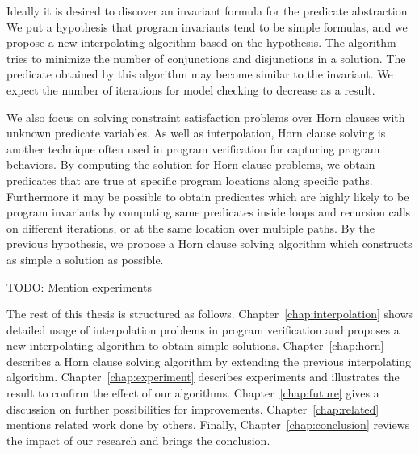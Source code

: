 Ideally it is desired to discover an invariant formula for the
predicate abstraction.  We put a hypothesis that program invariants
tend to be simple formulas, and we propose a new interpolating
algorithm based on the hypothesis.  The algorithm tries to minimize
the number of conjunctions and disjunctions in a solution.  The
predicate obtained by this algorithm may become similar to the
invariant. We expect the number of iterations for model checking to
decrease as a result.

We also focus on solving constraint satisfaction problems over Horn
clauses with unknown predicate variables.  As well as interpolation,
Horn clause solving is another technique often used in program
verification for capturing program behaviors.  By computing the
solution for Horn clause problems, we obtain predicates that are true
at specific program locations along specific paths.  Furthermore it
may be possible to obtain predicates which are highly likely to be
program invariants by computing same predicates inside loops and
recursion calls on different iterations, or at the same location over
multiple paths.  By the previous hypothesis, we propose a Horn clause
solving algorithm which constructs as simple a solution as possible.

TODO: Mention experiments

The rest of this thesis is structured as follows.
Chapter~\ref{chap:interpolation} shows detailed usage of interpolation
problems in program verification and proposes a new interpolating
algorithm to obtain simple solutions.  Chapter~\ref{chap:horn}
describes a Horn clause solving algorithm by extending the previous
interpolating algorithm.  Chapter~\ref{chap:experiment} describes
experiments and illustrates the result to confirm the effect of our
algorithms.  Chapter~\ref{chap:future} gives a discussion on further
possibilities for improvements. Chapter~\ref{chap:related} mentions
related work done by others.  Finally, Chapter~\ref{chap:conclusion}
reviews the impact of our research and brings the conclusion.
